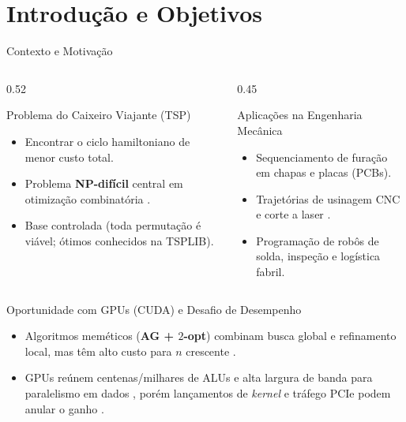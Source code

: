 
\section{Introdução e Objetivos}

\begin{frame}{Contexto e Motivação}
  \begin{columns}[T,onlytextwidth]
    \begin{column}{0.52\textwidth}
      \begin{block}{Problema do Caixeiro Viajante (TSP)}
        \begin{itemize}
          \item Encontrar o ciclo hamiltoniano de menor custo total.
          \item Problema \textbf{NP-difícil} central em otimização combinatória \autocite{cook2012pursuit}.
          \item Base controlada (toda permutação é viável; ótimos conhecidos na TSPLIB).
        \end{itemize}
      \end{block}
    \end{column}
    \begin{column}{0.45\textwidth}
      \begin{block}{Aplicações na Engenharia Mecânica}
        \begin{itemize}
          \item Sequenciamento de furação em chapas e placas (PCBs).
          \item Trajetórias de usinagem CNC e corte a laser \autocite{cook2012pursuit}.
          \item Programação de robôs de solda, inspeção e logística fabril.
        \end{itemize}
      \end{block}
    \end{column}
  \end{columns}

  \vspace{0.18cm}
  \begin{exampleblock}{Oportunidade com GPUs (CUDA) e Desafio de Desempenho}
    \begin{itemize}
      \item Algoritmos meméticos (\textbf{AG + $2$-opt}) combinam busca global e refinamento local, mas têm alto custo para $n$ crescente \autocite{larranaga1999genetic,croes1958method}.
      \item GPUs reúnem centenas/milhares de ALUs e alta largura de banda para paralelismo em dados \autocite{nvidia2024cuda}, porém lançamentos de \emph{kernel} e tráfego PCIe podem anular o ganho \autocite{schulz2013gpu,van2013gpu}.
    \end{itemize}
  \end{exampleblock}
\end{frame}

